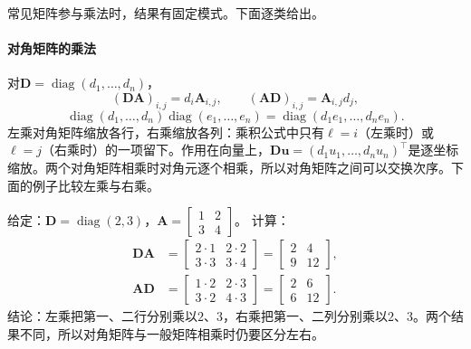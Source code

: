 常见矩阵参与乘法时，结果有固定模式。下面逐类给出。

\paragraph{对角矩阵的乘法}
对$\bm D=\operatorname{diag}(d_1,\ldots,d_n)$，
\[
 (\bm D\bm A)_{i,j}=d_i\bm A_{i,j},\qquad(\bm A\bm D)_{i,j}=\bm A_{i,j}d_j,
\]
\[
 \operatorname{diag}(d_1,\ldots,d_n)\operatorname{diag}(e_1,\ldots,e_n)=\operatorname{diag}(d_1e_1,\ldots,d_ne_n).
\]
左乘对角矩阵缩放各行，右乘缩放各列：乘积公式中只有$\ell=i$（左乘时）或$\ell=j$（右乘时）的一项留下。作用在向量上，$\bm D\bm u=(d_1u_1,\ldots,d_nu_n)^\top$是逐坐标缩放。两个对角矩阵相乘时对角元逐个相乘，所以对角矩阵之间可以交换次序。下面的例子比较左乘与右乘。
\begin{example}[左乘与右乘对角矩阵]
\label{ex:ls-diagonal-scaling}
给定：$\bm D=\operatorname{diag}(2,3)$，$\bm A=\left[\begin{smallmatrix}1&2\\3&4\end{smallmatrix}\right]$。
计算：
\[
 \begin{aligned}
 \bm D\bm A&=\begin{bmatrix}2\cdot1&2\cdot2\\3\cdot3&3\cdot4\end{bmatrix}=\begin{bmatrix}2&4\\9&12\end{bmatrix},\\
 \bm A\bm D&=\begin{bmatrix}1\cdot2&2\cdot3\\3\cdot2&4\cdot3\end{bmatrix}=\begin{bmatrix}2&6\\6&12\end{bmatrix}.
 \end{aligned}
\]
结论：左乘把第一、二行分别乘以$2$、$3$，右乘把第一、二列分别乘以$2$、$3$。两个结果不同，所以对角矩阵与一般矩阵相乘时仍要区分左右。
\end{example}


